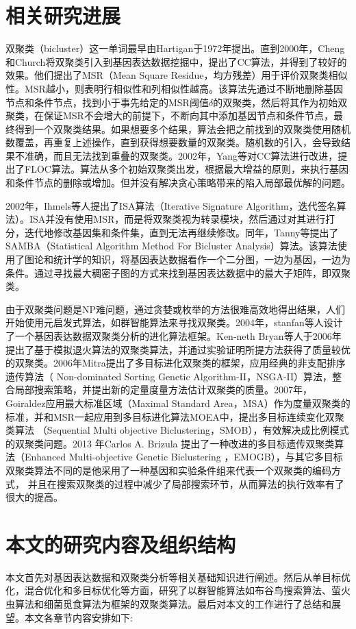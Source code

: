 \section{相关研究进展}
    双聚类（bicluster）这一单词最早由Hartigan于1972年提出。直到2000年，Cheng和Church将双聚类引入到基因表达数据挖掘中，提出了CC算法，并得到了较好的效果。他们提出了MSR（Mean Square Residue，均方残差）用于评价双聚类相似性。MSR越小，则表明行相似性和列相似性越高。该算法先通过不断地删除基因节点和条件节点，找到小于事先给定的MSR阈值$\delta$的双聚类，然后将其作为初始双聚类，在保证MSR不会增大的前提下，不断向其中添加基因节点和条件节点，最终得到一个双聚类结果。如果想要多个结果，算法会把之前找到的双聚类使用随机数覆盖，再重复上述操作，直到获得想要数量的双聚类。随机数的引入，会导致结果不准确，而且无法找到重叠的双聚类。2002年，Yang等对CC算法进行改进，提出了FLOC算法。算法从多个初始双聚类出发，根据最大增益的原则，来执行基因和条件节点的删除或增加。但并没有解决贪心策略带来的陷入局部最优解的问题。

    2002年，Ihmels等人提出了ISA算法（Iterative Signature Algorithm，迭代签名算法）。ISA并没有使用MSR，而是将双聚类视为转录模块，然后通过对其进行打分，迭代地修改基因集和条件集，直到无法再继续修改。同年，Tanny等提出了SAMBA（Statistical Algorithm Method For Bicluster Analysis）算法。该算法使用了图论和统计学的知识，将基因表达数据看作一个二分图，一边为基因，一边为条件。通过寻找最大稠密子图的方式来找到基因表达数据中的最大子矩阵，即双聚类。

    由于双聚类问题是NP难问题，通过贪婪或枚举的方法很难高效地得出结果，人们开始使用元启发式算法，如群智能算法来寻找双聚类。2004年，stanfan等人设计了一个基因表达数据双聚类分析的进化算法框架。Ken-neth Bryan等人于2006年提出了基于模拟退火算法的双聚类算法，并通过实验证明所提方法获得了质量较优的双聚类。2006年Mitra提出了多目标进化双聚类的框架，应用经典的非支配排序遗传算法（ Non-dominated Sorting Genetic Algorithm-II，NSGA-II）算法，整合局部搜索策略，并提出新的定量度量方法估计双聚类的质量。2007年，Goiraldez应用最大标准区域（Maximal Standard Area，MSA）作为度量双聚类的标准，并和MSR一起应用到多目标进化算法MOEA中，提出多目标连续变化双聚类算法 （Sequential Multi objective Biclustering，SMOB），有效解决成比例模式的双聚类问题。2013 年Carlos A. Brizula 提出了一种改进的多目标遗传双聚类算法（Enhanced Multi-objective Genetic Biclustering ，EMOGB），与其它多目标双聚类算法不同的是他采用了一种基因和实验条件组来代表一个双聚类的编码方式， 并且在搜索双聚类的过程中减少了局部搜索环节，从而算法的执行效率有了很大的提高。
    

\section{本文的研究内容及组织结构}
    本文首先对基因表达数据和双聚类分析等相关基础知识进行阐述。然后从单目标优化，混合优化和多目标优化等方面，研究了以群智能算法如布谷鸟搜索算法、萤火虫算法和细菌觅食算法为框架的双聚类算法。最后对本文的工作进行了总结和展望。本文各章节内容安排如下:

